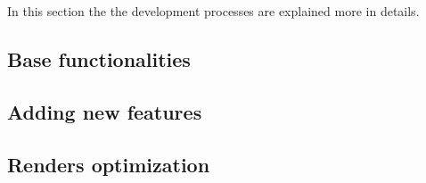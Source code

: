
In this section the the development processes are explained more in details.
\subsection{Base functionalities}
\label{subsec:BaseFunctionalities}


\subsection{Adding new features}
\label{subsec:AddingNewFeatures}


\subsection{Renders optimization}
\label{subsec:RendersOptimization}

